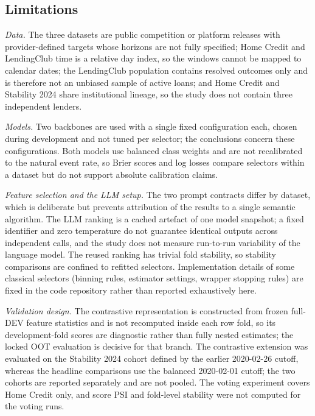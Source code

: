 \documentclass[preprint,12pt]{elsarticle}
\begin{document}
\subsection{Limitations}
\label{subsec:limitations}

\emph{Data.} The three datasets are public competition or platform releases with provider-defined targets whose horizons are not fully specified; Home Credit and LendingClub time is a relative day index, so the windows cannot be mapped to calendar dates; the LendingClub population contains resolved outcomes only and is therefore not an unbiased sample of active loans; and Home Credit and Stability 2024 share institutional lineage, so the study does not contain three independent lenders.

\emph{Models.} Two backbones are used with a single fixed configuration each, chosen during development and not tuned per selector; the conclusions concern these configurations. Both models use balanced class weights and are not recalibrated to the natural event rate, so Brier scores and log losses compare selectors within a dataset but do not support absolute calibration claims.

\emph{Feature selection and the LLM setup.} The two prompt contracts differ by dataset, which is deliberate but prevents attribution of the results to a single semantic algorithm. The LLM ranking is a cached artefact of one model snapshot; a fixed identifier and zero temperature do not guarantee identical outputs across independent calls, and the study does not measure run-to-run variability of the language model. The reused ranking has trivial fold stability, so stability comparisons are confined to refitted selectors. Implementation details of some classical selectors (binning rules, estimator settings, wrapper stopping rules) are fixed in the code repository rather than reported exhaustively here.

\emph{Validation design.} The contrastive representation is constructed from frozen full-DEV feature statistics and is not recomputed inside each row fold, so its development-fold scores are diagnostic rather than fully nested estimates; the locked OOT evaluation is decisive for that branch. The contrastive extension was evaluated on the Stability 2024 cohort defined by the earlier 2020-02-26 cutoff, whereas the headline comparisons use the balanced 2020-02-01 cutoff; the two cohorts are reported separately and are not pooled. The voting experiment covers Home Credit only, and score PSI and fold-level stability were not computed for the voting runs.
\end{document}
